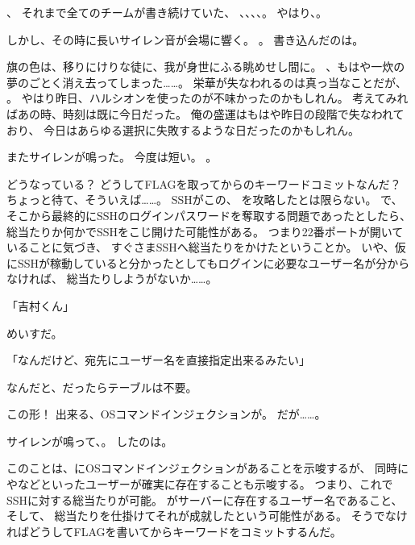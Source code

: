 、
それまで全てのチームが書き続けていた、
\urandom、\ZxZ、\wasamusume、\mofupp、。
やはり、。

しかし、その時に長いサイレン音が会場に響く。
。
書き込んだのは\ZxZ。

旗の色は、移りにけりな徒に、我が身世にふる眺めせし間に。
、もはや一炊の夢のごとく消え去ってしまった……。
栄華が失なわれるのは真っ当なことだが、
。
やはり昨日、ハルシオンを使ったのが不味かったのかもしれん。
考えてみればあの時、時刻は既に今日だった。
俺の盛運はもはや昨日の段階で失なわれており、
今日はあらゆる選択に失敗するような日だったのかもしれん。

またサイレンが鳴った。
今度は短い。
。

どうなっている？
どうしてFLAGを取ってからのキーワードコミットなんだ？
ちょっと待て、そういえば……。
SSHがこの、
を攻略したとは限らない。
で、
そこから最終的にSSHのログインパスワードを奪取する問題であったとしたら、
総当たりか何かでSSHをこじ開けた可能性がある。
つまり22番ポートが開いていることに気づき、
すぐさまSSHへ総当たりをかけたということか。
いや、仮にSSHが稼動していると分かったとしてもログインに必要なユーザー名が分からなければ、
総当たりしようがないか……。

「吉村くん」

めいすだ。

「なんだけど、宛先にユーザー名を直接指定出来るみたい」

なんだと、だったらテーブルは不要。



この形！
出来る、OSコマンドインジェクションが。
だが……。

サイレンが鳴って、。
したのは\ZxZ。

このことは、にOSコマンドインジェクションがあることを示唆するが、
同時にやなどといったユーザーが確実に存在することも示唆する。
つまり、これでSSHに対する総当たりが可能。
がサーバーに存在するユーザー名であること、
そして、
総当たりを仕掛けてそれが成就したという可能性がある。
そうでなければどうしてFLAGを書いてからキーワードをコミットするんだ。

